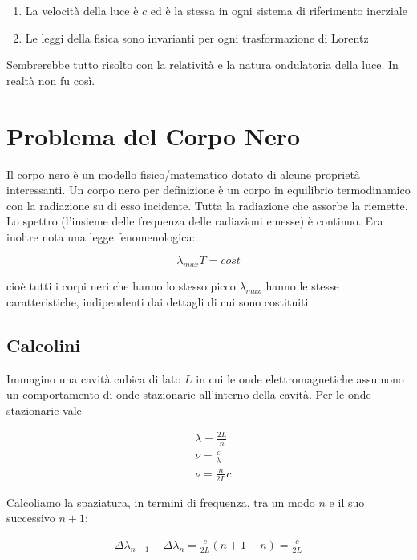 \documentclass[11pt,a4paper]{article}
\begin{document}
\begin{enumerate}
\item
La velocità della luce è $c$ ed è la stessa in ogni sistema di riferimento inerziale
\item
Le leggi della fisica sono invarianti per ogni trasformazione di Lorentz
\end{enumerate}

Sembrerebbe tutto risolto con la relatività e la natura ondulatoria della luce. In realtà non fu così.

\section{Problema del Corpo Nero}

Il corpo nero è un modello fisico/matematico dotato di alcune proprietà interessanti. Un corpo nero per definizione è un corpo in equilibrio termodinamico con la radiazione su di esso incidente. Tutta la radiazione che assorbe la riemette. Lo spettro (l'insieme delle frequenza delle radiazioni emesse) è continuo.
Era inoltre nota una legge fenomenologica:

\begin{equation}
\lambda_{max}T = cost
\end{equation}

cioè tutti i corpi neri che hanno lo stesso picco $ \lambda_{max} $ hanno le stesse caratteristiche, indipendenti dai dettagli di cui sono costituiti.

\subsection{Calcolini}
Immagino una cavità cubica di lato $ L $ in cui le onde elettromagnetiche assumono un comportamento di onde stazionarie all'interno della cavità. Per le onde stazionarie vale

\begin{align}
& \lambda = \frac{2L}{n} \\ \nonumber
& \nu = \frac{c}{\lambda} \\ \nonumber
& \nu = \frac{n}{2L} c
\end{align}

Calcoliamo la spaziatura, in termini di frequenza, tra un modo $ n $ e il suo successivo $ n + 1 $:

\begin{align}
\Delta\lambda_{n+1}-\Delta\lambda_{n} = \frac{c}{2L} (n+1-n) = \frac{c}{2L}
\end{align}
\end{document}
